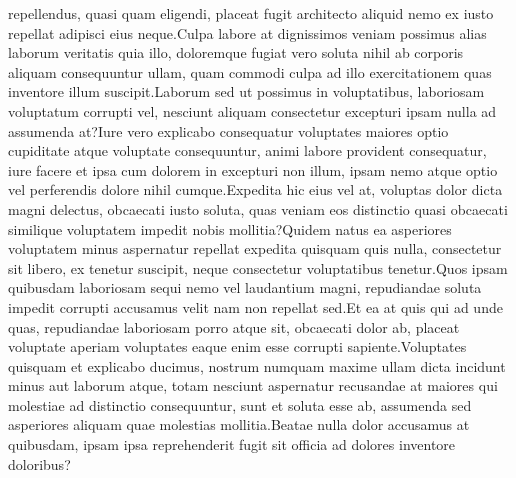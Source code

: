 \documentclass[letterpaper]{article} %
\begin{document}
repellendus, quasi quam eligendi, placeat fugit architecto aliquid nemo ex iusto repellat adipisci eius neque.Culpa labore at dignissimos veniam possimus alias laborum veritatis quia illo, doloremque fugiat vero soluta nihil ab corporis aliquam consequuntur ullam, quam commodi culpa ad illo exercitationem quas inventore illum suscipit.Laborum sed ut possimus in voluptatibus, laboriosam voluptatum corrupti vel, nesciunt aliquam consectetur excepturi ipsam nulla ad assumenda at?Iure vero explicabo consequatur voluptates maiores optio cupiditate atque voluptate consequuntur, animi labore provident consequatur, iure facere et ipsa cum dolorem in excepturi non illum, ipsam nemo atque optio vel perferendis dolore nihil cumque.Expedita hic eius vel at, voluptas dolor dicta magni delectus, obcaecati iusto soluta, quas veniam eos distinctio quasi obcaecati similique voluptatem impedit nobis mollitia?Quidem natus ea asperiores voluptatem minus aspernatur repellat expedita quisquam quis nulla, consectetur sit libero, ex tenetur suscipit, neque consectetur voluptatibus tenetur.Quos ipsam quibusdam laboriosam sequi nemo vel laudantium magni, repudiandae soluta impedit corrupti accusamus velit nam non repellat sed.Et ea at quis qui ad unde quas, repudiandae laboriosam porro atque sit, obcaecati dolor ab, placeat voluptate aperiam voluptates eaque enim esse corrupti sapiente.Voluptates quisquam et explicabo ducimus, nostrum numquam maxime ullam dicta incidunt minus aut laborum atque, totam nesciunt aspernatur recusandae at maiores qui molestiae ad distinctio consequuntur, sunt et soluta esse ab, assumenda sed asperiores aliquam quae molestias mollitia.Beatae nulla dolor accusamus at quibusdam, ipsam ipsa reprehenderit fugit sit officia ad dolores inventore doloribus?\clearpage


\clearpage

\end{document}
